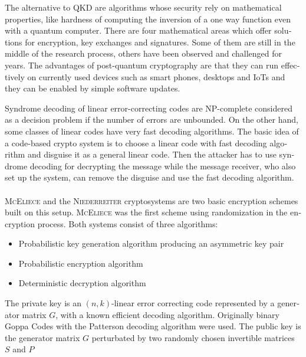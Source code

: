 \documentclass[a4paper,11pt]{article}
\begin{document}
\begin{otherlanguage}{english}
\begin{multicols}{2}
\noindent

The alternative to QKD are algorithms whose security rely on mathematical properties, like hardness of computing the inversion of a one way function even with a quantum computer. There are four mathematical areas which offer solutions for encryption, key exchanges and signatures. Some of them are still in the middle of the research process, others have been observed and challenged for years. The advantages of post-quantum cryptography are that they can run effectively on currently used devices such as smart phones, desktops and IoTs and they can be enabled by simple software updates.

Syndrome decoding of linear error-correcting codes are NP-complete considered as a decision problem if the number of errors are unbounded. On the other hand, some classes of linear codes have very fast decoding algorithms. The basic idea of a code-based crypto system is to choose a linear code with fast decoding algorithm and disguise it as a general linear code. Then the attacker has to use syndrome decoding for decrypting the message while the message receiver, who also set up the system, can remove the disguise and use the fast decoding algorithm. \\
\\
\textsc{McEliece} and the \textsc{Niederreiter} cryptosystems are two basic encryption schemes built on this setup. \textsc{McEliece} was the first scheme using randomization in the encryption process. Both systems consist of three algorithms:

\begin{itemize} [noitemsep, nolistsep]
\item[1)] Probabilistic key generation algorithm producing an asymmetric key pair
\item[2)] Probabilistic encryption algorithm
\item[3)] Deterministic decryption algorithm
\end{itemize} 

\vspace{0.4cm}

The private key is an $(n,k)$-linear error correcting code represented by a generator matrix $G$, with a known efficient decoding algorithm. Originally binary Goppa Codes with the Patterson decoding algorithm were used. The public key is the generator matrix $G$ perturbated by two randomly chosen invertible matrices $S$ and $P$


\end{multicols}
\end{otherlanguage}
\end{document}
